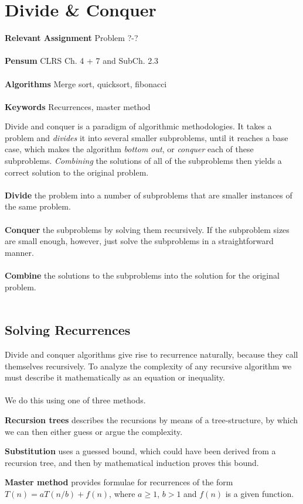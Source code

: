 
\chapter{Divide \& Conquer}
\label{ch:divideandconquer}

\textbf{Relevant Assignment} Problem ?-?\\\\
\textbf{Pensum} CLRS Ch. 4 + 7 and SubCh. 2.3\\\\
\textbf{Algorithms} Merge sort, quicksort, fibonacci\\\\
\textbf{Keywords} Recurrences, master method
\vspace{1in}

\noindent Divide and conquer is a paradigm of algorithmic methodologies. It
takes a problem and \textit{divides} it into several smaller subproblems,
until it reaches a base case, which makes the algorithm \textit{bottom out},
or \textit{conquer} each of these subproblems. \textit{Combining} the
solutions of all of the subproblems then yields a correct solution to the
original problem.
\\\\
\noindent \textbf{Divide} the problem into a number of subproblems that are
smaller instances of the same problem.
\\\\
\noindent \textbf{Conquer} the subproblems by solving them recursively. If the
subproblem sizes are small enough, however, just solve the subproblems in a
straightforward manner.
\\\\
\noindent \textbf{Combine} the solutions to the subproblems into the solution
for the original problem.
\\\\

\section{Solving Recurrences}
Divide and conquer algorithms give rise to recurrence naturally, because they
call themselves recursively. To analyze the complexity of any recursive
algorithm we must describe it mathematically as an equation or inequality.
\\\\
We do this using one of three methods.
\begin{description}
	\item \textbf{Recursion trees} describes the recursions by means of a
tree-structure, by which we can then either guess or argue the complexity.
	\item \textbf{Substitution} uses a guessed bound, which could have been
derived from a recursion tree, and then by mathematical induction proves this
bound.
	\item \textbf{Master method} provides formulae for recurrences of the form
$T(n) = a T(n/b) + f(n)$, where $a \geq 1$, $b > 1$ and $f(n)$ is a given
function.
\end{description}

